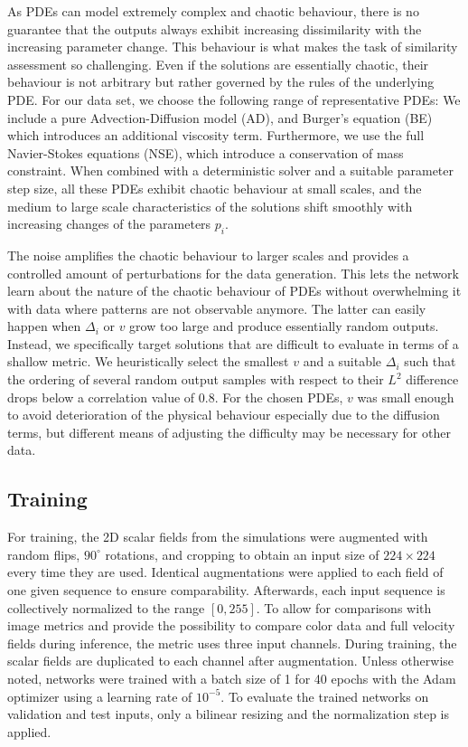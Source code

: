 \documentclass{article}
\begin{document}
As PDEs can model extremely complex and chaotic behaviour, there is no guarantee that the outputs always exhibit increasing dissimilarity with the increasing parameter change. This behaviour is what makes the task of similarity assessment so challenging. Even if the solutions are essentially chaotic, their behaviour is not arbitrary but rather governed by the rules of the underlying PDE. 
For our data set, we choose the following range of representative PDEs:
We include a pure Advection-Diffusion model (AD), and Burger's equation (BE) which introduces an additional viscosity term. Furthermore, we use the full Navier-Stokes equations (NSE), which introduce a conservation of mass constraint. When combined with a deterministic solver and a suitable parameter step size, all these PDEs exhibit chaotic behaviour at small scales, and the medium to large scale characteristics of the solutions shift smoothly with increasing changes of the parameters $p_i$.

The noise amplifies the chaotic behaviour to larger scales and provides a controlled amount of perturbations for the data generation. This lets the network learn about the nature of the chaotic behaviour of PDEs without overwhelming it with data where patterns are not observable anymore.
The latter can easily happen when $\Delta_i$ or $v$ grow too large and produce essentially random outputs. Instead, we specifically target solutions that are difficult to evaluate in terms of a shallow metric. We heuristically select the smallest $v$ and a suitable $\Delta_i$ such that the ordering of several random output samples with respect to their $L^2$ difference drops below a correlation value of $0.8$. For the chosen PDEs, $v$ was small enough to avoid deterioration of the physical behaviour especially due to the diffusion terms, but different means of adjusting the difficulty may be necessary for other data.

\subsection{Training}
For training, the 2D scalar fields from the simulations were augmented with random flips, $90^{\circ}$ rotations, and cropping to obtain an input size of $224\times224$ every time they are used. Identical augmentations were applied to each field of one given sequence to ensure comparability. Afterwards, each input sequence is collectively normalized to the range $[0, 255]$. To allow for comparisons with image metrics and provide the possibility to compare color data and full velocity fields during inference, the metric uses three input channels. During training, the scalar fields are duplicated to each channel after augmentation.
Unless otherwise noted, networks were trained with a batch size of 1 for 40 epochs with the Adam optimizer using a learning rate of $10^{-5}$.
To evaluate the trained networks on validation and test inputs, only a bilinear resizing and the normalization step is applied.
\end{document}
